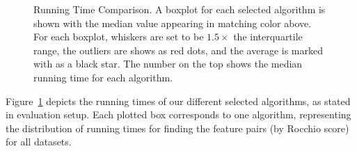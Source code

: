 \begin{figure}[h]
\centering %
\vspace{-5mm}
\vspace{-5mm}
\caption{Running Time Comparison. A boxplot for each selected algorithm is shown with the median value appearing in matching color above. For each boxplot, whiskers are set to be $1.5\times$ the interquartile range, the outliers are shows as red dots, and the average is marked with as a black star. The number on the top shows the median running time for each algorithm.}
\vspace{-5mm}
\label{fig:time}
\end{figure}

 Figure~\ref{fig:time} depicts the running times of our different selected algorithms, as stated in evaluation setup. Each plotted box corresponds to one algorithm, representing the distribution of running times for finding the \topk feature pairs (by Rocchio score) for all datasets.


